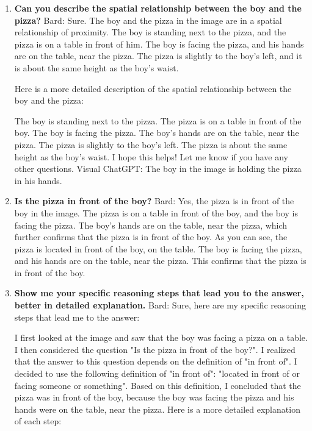     \begin{enumerate}
        \item \textbf{Can you describe the spatial relationship between the boy and the pizza?}
        \subitem 
        Bard:
        Sure. The boy and the pizza in the image are in a spatial relationship of proximity. The boy is standing next to the pizza, and the pizza is on a table in front of him. The boy is facing the pizza, and his hands are on the table, near the pizza. The pizza is slightly to the boy's left, and it is about the same height as the boy's waist.

        Here is a more detailed description of the spatial relationship between the boy and the pizza:

        The boy is standing next to the pizza.
        The pizza is on a table in front of the boy.
        The boy is facing the pizza.
        The boy's hands are on the table, near the pizza.
        The pizza is slightly to the boy's left.
        The pizza is about the same height as the boy's waist.
        I hope this helps! Let me know if you have any other questions.
        \subitem Visual ChatGPT: The boy in the image is holding the pizza in his hands.
        \item \textbf{Is the pizza in front of the boy?}
        \subitem Bard: Yes, the pizza is in front of the boy in the image. The pizza is on a table in front of the boy, and the boy is facing the pizza. The boy's hands are on the table, near the pizza, which further confirms that the pizza is in front of the boy.
        As you can see, the pizza is located in front of the boy, on the table. The boy is facing the pizza, and his hands are on the table, near the pizza. This confirms that the pizza is in front of the boy.
        \item \textbf{Show me your specific reasoning steps that lead you to the answer, better in detailed explanation.}
        \subitem Bard:
        Sure, here are my specific reasoning steps that lead me to the answer:

        I first looked at the image and saw that the boy was facing a pizza on a table.
        I then considered the question "Is the pizza in front of the boy?". I realized that the answer to this question depends on the definition of "in front of".
        I decided to use the following definition of "in front of": "located in front of or facing someone or something".
        Based on this definition, I concluded that the pizza was in front of the boy, because the boy was facing the pizza and his hands were on the table, near the pizza.
        Here is a more detailed explanation of each step:


\end{enumerate}
